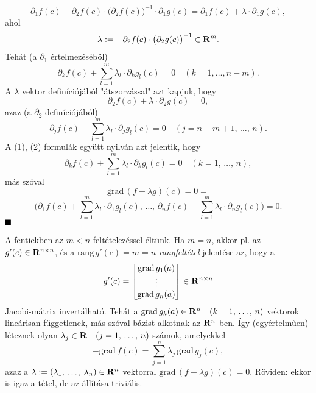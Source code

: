 \[
	\partial_1f(c) - \partial_2f(c) \cdot \big( \partial_2 f(c) \big)^{-1} \cdot \partial_1g(c) = \partial_1f(c) + \lambda \cdot \partial_1g(c),
\]
ahol
\[
	\lambda := -\partial_2f(c) \cdot \big( \partial_2g(c) \big)^{-1} \in \mathbf{R}^m.
\]
Tehát (a $\partial_1$ értelmezéséből)
\begin{equation}
	\partial_k f(c) + \sum_{l=1}^{m} \lambda_l \cdot \partial_k g_l(c) = 0 \quad (k = 1, \dots, n - m).
	\label{eq:eq1}
\end{equation}
A $\lambda$ vektor definíciójából "átszorzással" azt kapjuk, hogy
\[
	\partial_2f(c) + \lambda \cdot \partial_2 g(c) = 0,
\]
azaz (a $\partial_2$ definíciójából)
\begin{equation}
	\partial_jf(c) + \sum_{l=1}^m \lambda_l \cdot \partial_j g_l(c) = 0 \quad (j = n-m+1, \, \dots, \, n).
	\label{eq:eq2}
\end{equation}
A (1), (2) formulák együtt nyilván azt jelentik, hogy
\[
	\partial_kf(c) + \sum_{l=1}^m \lambda_l \cdot \partial_k g_l(c) = 0 \quad (k = 1, \, \dots, \, n),
\]
más szóval
\[
	\text{grad} \, (f + \lambda g)(c) = 0 =
\]
\[
	\Big( \partial_1f(c) + \sum_{l=1}^m \lambda_l \cdot \partial_1 g_l(c), \, \dots, \, \partial_nf(c) + \sum_{l=1}^m \lambda_l \cdot \partial_n g_l(c) \Big) = 0. 
\]
$\hfill \blacksquare$

A fentiekben az $m < n$ feltételezéssel éltünk. Ha $m = n$, akkor pl. az $g'(c) \in \mathbf{R}^{n \times n}$, és a $\text{rang} \, g'(c) = m = n$ \textit{rangfeltétel} jelentése az, hogy a
\[
g'(c) = \begin{bmatrix}
	\text{grad} \, g_1(a) \\
	\vdots \\
	\text{grad} \, g_n(a) \\
\end{bmatrix} \in \mathbf{R}^{n \times n}
\]
Jacobi-mátrix invertálható. Tehát a $\text{grad} \, g_k(a) \in \mathbf{R}^n \quad (k = 1, \, \dots, \, n)$ vektorok lineárisan függetlenek, más szóval bázist alkotnak az $\mathbf{R}^n$-ben. Így (egyértelműen) léteznek olyan $\lambda_j \in \mathbf{R} \quad (j = 1, \, \dots, \, n)$ számok, amelyekkel
\[
- \text{grad} \, f(c) = \sum_{j=1}^n \lambda_j \, \text{grad} \, g_j(c),
\]
azaz a $\lambda := (\lambda_1, \, \dots, \, \lambda_n) \in \mathbf{R}^n$ vektorral $\text{grad} \, (f + \lambda g)(c) = 0$. Röviden: ekkor is igaz a tétel, de az állítása triviális.\\

